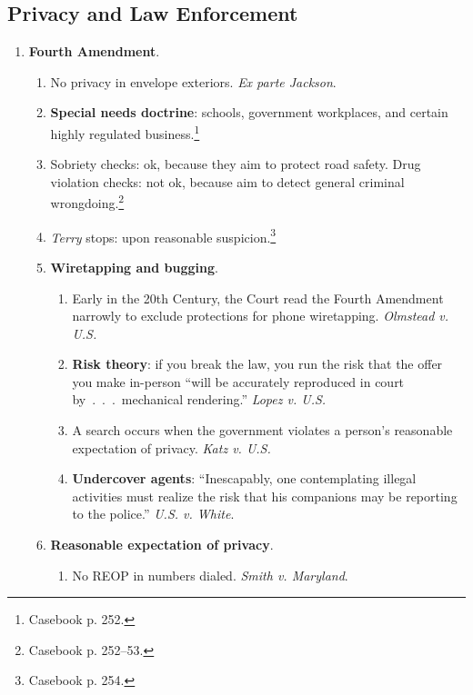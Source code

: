 \newpage

\subsection{Privacy and Law Enforcement}

\begin{enumerate}
    \item \textbf{Fourth Amendment}.
    \begin{enumerate}
        \item No privacy in envelope exteriors. \emph{Ex parte Jackson}.
        \item \textbf{Special needs doctrine}: schools, government workplaces, 
        and certain highly regulated business.\footnote{Casebook p. 252.}
        \item Sobriety checks: ok, because they aim to protect road safety. 
        Drug violation checks: not ok, because aim to detect general criminal 
        wrongdoing.\footnote{Casebook p. 252--53.}
        \item \emph{Terry} stops: upon reasonable suspicion.\footnote{Casebook 
        p.  254.}
        \item \textbf{Wiretapping and bugging}.
        \begin{enumerate}
            \item Early in the 20th Century, the Court read the Fourth 
            Amendment narrowly to exclude protections for phone wiretapping. 
            \emph{Olmstead v. U.S.}
            \item \textbf{Risk theory}: if you break the law, you run the risk 
            that the offer you make in-person ``will be accurately reproduced 
            in court by~.~.~.~mechanical rendering.'' \emph{Lopez v. U.S.}
            \item A search occurs when the government violates a person's 
            reasonable expectation of privacy. \emph{Katz v. U.S.}
            \item \textbf{Undercover agents}: ``Inescapably, one contemplating 
            illegal activities must realize the risk that his companions may 
            be reporting to the police.'' \emph{U.S. v. White}.
        \end{enumerate}
        \item \textbf{Reasonable expectation of privacy}.
        \begin{enumerate}
            \item No REOP in numbers dialed. \emph{Smith v. Maryland}.

\end{enumerate}
\end{enumerate}
\end{enumerate}
